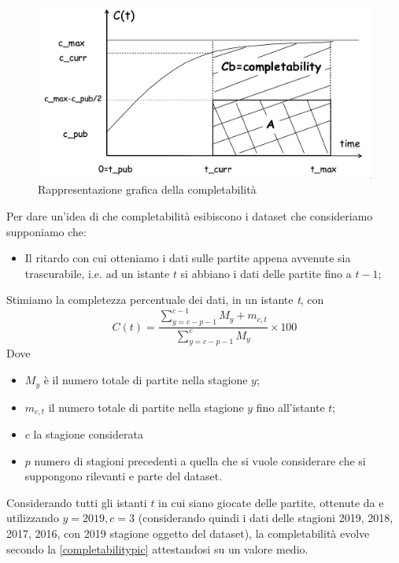 \begin{figure}
\caption{Rappresentazione grafica della completabilità \cite{batini2006}}
\label{completabilitypic_gen}
\includegraphics[width=\linewidth]{completability_gen.png}
\end{figure}

\par

Per dare un'idea di che completabilità esibiscono i dataset che consideriamo supponiamo che:


\begin{itemize}
	\item Il ritardo con cui otteniamo i dati sulle partite appena avvenute sia trascurabile, i.e. ad un istante $t$ si abbiano i dati delle partite fino a $t-1$;
\end{itemize}
	Stimiamo la completezza percentuale dei dati, in un istante \textit{t}, con 
	\begin{equation}
	C(t) = \frac{\sum\limits_{y=c-p-1}^{c-1} M_{y} + m_{c,t}}{\sum\limits_{y=c-p-1}^{c} M_{y}} \times 100
	\end{equation}
	Dove \begin{itemize}
		\item $M_y$ è il numero totale di partite nella stagione $y$;
		\item $m_{c,t}$ il numero totale di partite nella stagione $y$ fino all'istante $t$;
		\item $c$ la stagione considerata
		\item $p$ numero di stagioni precedenti a quella che si vuole considerare che si suppongono rilevanti e parte del dataset.
	\end{itemize}

Considerando tutti gli istanti $t$ in cui siano giocate delle partite, ottenute da \cite{nba_schedule} e utilizzando $y = 2019, c = 3$ (considerando quindi i dati delle stagioni 2019, 2018, 2017, 2016, con 2019 stagione oggetto del dataset), la completabilità evolve secondo la \autoref{completabilitypic} attestandosi su un valore medio.

